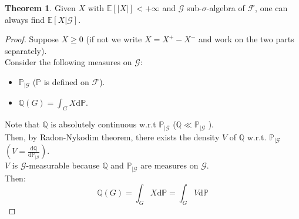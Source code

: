 \documentclass[10pt,a4paper]{article}
\theoremstyle{definition}
\newtheorem{teo}{Theorem}[section]
\begin{document}
\begin{teo}
	Given $ X $ with $\mathbb{E}[|X|]<+\infty$ and $ \mathcal{G}$ sub-$\sigma$-algebra of  $\mathcal{F} $, one can always find $\mathbb{E}[X|\mathcal{G}]$.
\end{teo}
\begin{proof}
	Suppose $X\geq0$ (if not we write $X=X^{+}-X^{-}$ and work on the two parts separately).\\
	Consider the following measures on $\mathcal{G}$: \\
	\begin{itemize}
		\item $ \mathbb{P}_{|\mathcal{G}} $ ($\mathbb{P}$ is defined on $ \mathcal{F} $). \\
		\item $ \mathbb{Q}(G)=\int_{G}X\mathrm{d}\mathbb{P} $. \\
	\end{itemize}
	Note that $\mathbb{Q}$ is absolutely continuous w.r.t $\mathbb{P}_{|\mathcal{G}}$ ($\mathbb{Q}\ll\mathbb{P}_{|\mathcal{G}}$ ). \\
	Then, by Radon-Nykodim theorem, there exists the density $V$ of $\mathbb{Q}$ w.r.t. $\mathbb{P}_{|\mathcal{G}}$ $ \left(V=\frac{\mathrm{d}\mathbb{Q}}{\mathrm{d}\mathbb{P}_{|\mathcal{G}}}\right). $ \\
	$V$ is $\mathcal{G}$-measurable because $\mathbb{Q}$ and $\mathbb{P}_{|\mathcal{G}}$ are measures on $\mathcal{G}$.\\
	Then:
	\begin{equation*}
		\mathbb{Q}(G)=\int_{G}X\mathrm{d}\mathbb{P}=\int_{G}V\mathrm{d}\mathbb{P}
	\end{equation*}
\end{proof}
\end{document}
